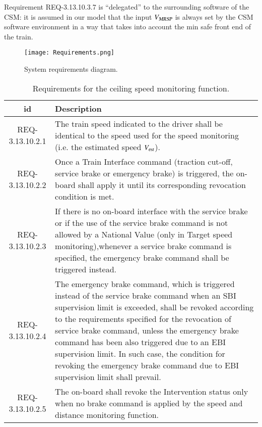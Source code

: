 Requirement REQ-3.13.10.3.7 is ``delegated'' to the surrounding software of the CSM: it is assumed in our model that the input ${V_{\text{\sl MRSP}}}$ is always set by the CSM software environment in a way that takes into account the min safe front end of the train.



 \begin{figure}
 \centering
 \hspace*{-20mm}
\texttt{[image: Requirements.png]}
\caption{System requirements diagram.}
 \label{fig:req}
 \end{figure}


 \begin{table}[htdp]
\caption{Requirements for the ceiling speed monitoring function.}
\begin{center}
\footnotesize
\hspace*{-15mm}
\begin{tabular}{|c|p{130mm}|}
\hline\hline
{\bf id} & {\bf Description}
\\\hline\hline
REQ-3.13.10.2.1 & The train speed indicated to the driver shall be identical to the speed used for the speed monitoring (i.e. the estimated speed ${V_{\text{\sl est}}}$).
\\\hline
REQ-3.13.10.2.2 & Once a Train Interface command (traction cut-off, service brake or emergency brake) is triggered, the on-board shall apply it until its corresponding revocation condition is met.
\\\hline
REQ-3.13.10.2.3 &
If there is no on-board interface with the service brake or if the use of the service brake command is not allowed by a National Value (only in Target speed monitoring),whenever a service brake command is specified, the emergency brake command shall be triggered instead.
\\\hline
REQ-3.13.10.2.4 &
The emergency brake command, which is triggered instead of the service brake command when an SBI supervision limit is exceeded, shall be revoked according to the requirements specified for the revocation of service brake command, unless the emergency brake command has been also triggered due to an EBI supervision limit. In such case, the condition for revoking the emergency brake command due to EBI supervision limit shall prevail.
\\\hline
REQ-3.13.10.2.5 &
The on-board shall revoke the Intervention status only when no brake command is applied by the speed and distance monitoring function.

\end{tabular}
\end{center}
\end{table}
